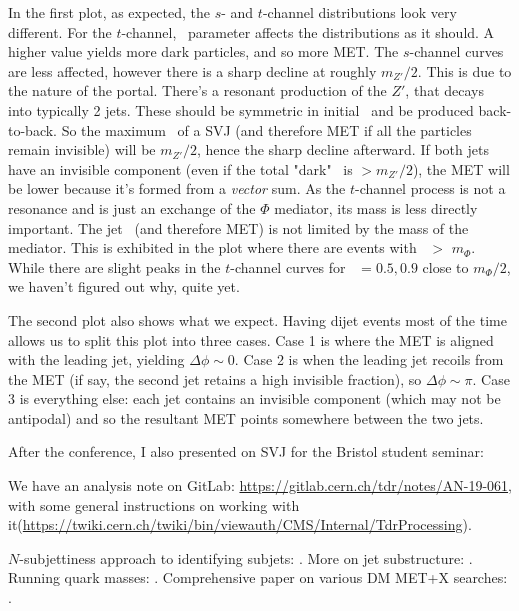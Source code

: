 In the first plot, as expected, the $s$- and $t$-channel distributions look very different. For the $t$-channel, \rinv\ parameter affects the distributions as it should. A higher value yields more dark particles, and so more MET. The $s$-channel curves are less affected, however there is a sharp decline at roughly $m_{Z'}/2$. This is due to the nature of the portal. There's a resonant production of the $Z'$, that decays into typically 2 jets. These should be symmetric in initial \pT\ and be produced back-to-back. So the maximum \pT\ of a SVJ (and therefore MET if all the particles remain invisible) will be $m_{Z'}/2$, hence the sharp decline afterward. If both jets have an invisible component (even if the total "dark" \pT\ is $> m_{Z'}/2$), the MET will be lower because it's formed from a \emph{vector} sum. As the $t$-channel process is not a resonance and is just an exchange of the $\Phi$ mediator, its mass is less directly important. The jet \pT\ (and therefore MET) is not limited by the mass of the mediator. This is exhibited in the plot where there are events with \ptmiss\ $>$ $m_{\Phi}$. While there are slight peaks in the $t$-channel curves for \rinv\ $= 0.5, 0.9$ close to $m_{\Phi}/2$, we haven't figured out why, quite yet.

The second plot also shows what we expect. Having dijet events most of the time allows us to split this plot into three cases. Case 1 is where the MET is aligned with the leading jet, yielding $\Delta\phi \sim 0$. Case 2 is when the leading jet recoils from the MET (if say, the second jet retains a high invisible fraction), so $\Delta\phi \sim \pi$. Case 3 is everything else: each jet contains an invisible component (which may not be antipodal) and so the resultant MET points somewhere between the two jets.

After the conference, I also presented on SVJ for the Bristol student seminar: %

We have an analysis note on GitLab: \url{https://gitlab.cern.ch/tdr/notes/AN-19-061}, with some general instructions on working with it(\url{https://twiki.cern.ch/twiki/bin/viewauth/CMS/Internal/TdrProcessing}).

$N$-subjettiness approach to identifying subjets: \cite{Thaler:2010tr}.
More on jet substructure: \cite{Freytsis:2014hpa}.
Running quark masses: \cite{Bednyakov:2016onn}.
Comprehensive paper on various DM MET+X searches: \cite{Aaboud:2019yqu}.
